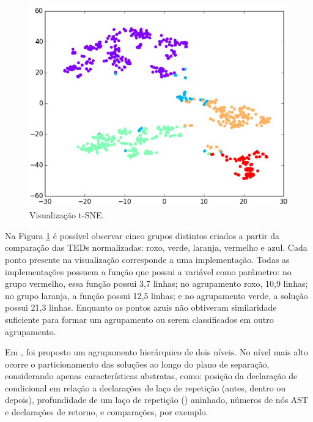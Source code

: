 	    \begin{figure}[ht]
	        \centering
	        \includegraphics[scale=0.5]{imagem/visualizacao-tSNE.png}
	        \captionsetup{justification=centering}
	        \caption{Visualização t-SNE.}
	        \label{fig:t-SNE}
	    \end{figure}
	    
	    Na Figura \ref{fig:t-SNE} é possível observar cinco grupos distintos
	    criados a partir da comparação das TEDs normalizadas: roxo, verde, laranja,
	    vermelho e azul. Cada ponto presente na visualização corresponde a uma
	    implementação. Todas as implementações possuem a função 
	    que possui a variável  como parâmetro: no grupo vermelho,
	    essa função possui 3,7 linhas; no agrupamento roxo, 10,9 linhas; no
	    grupo laranja, a função possui 12,5 linhas; e no agrupamento verde,
	    a solução possui 21,3 linhas. Enquanto os pontos azuis não obtiveram
	    similaridade suficiente para formar um agrupamento ou serem classificados
	    em outro agrupamento. 
	
	    
	    Em , foi proposto um agrupamento hierárquico de dois
	    níveis. No nível mais alto ocorre o particionamento das soluções ao longo do
	    plano de separação, considerando apenas características abstratas, como:
	    posição da declaração de condicional em relação a declarações de laço de
	    repetição (antes, dentro ou depois), profundidade de um laço de repetição
	    () aninhado, números de nós AST e declarações de retorno,
	     e comparações, por exemplo.
	    
